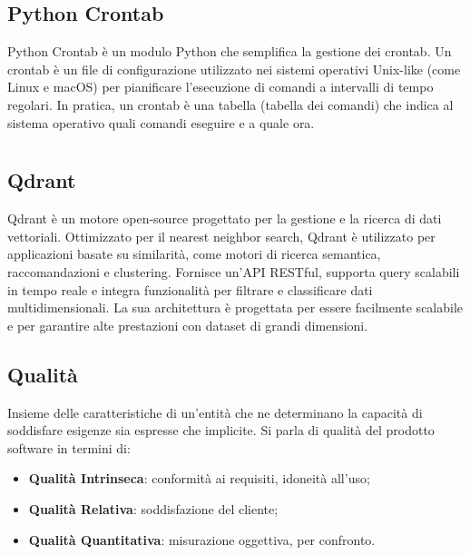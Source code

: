 \hypertarget{sec:python_crontab}{}
\subsection*{Python Crontab}
Python Crontab è un modulo Python che semplifica la gestione dei crontab. Un crontab è un file di configurazione utilizzato nei 
sistemi operativi Unix-like (come Linux e macOS) per pianificare l'esecuzione di comandi a intervalli di tempo regolari. In pratica, 
un crontab è una tabella (tabella dei comandi) che indica al sistema operativo quali comandi eseguire e a quale ora.

\newpage



\section{}

\hypertarget{sec:qdrant}{}
\subsection*{Qdrant}
Qdrant è un motore open-source progettato per la gestione e la ricerca di dati vettoriali. Ottimizzato per il nearest neighbor search, Qdrant è utilizzato 
per applicazioni basate su similarità, come motori di ricerca semantica, raccomandazioni e clustering. Fornisce un'API RESTful, supporta query scalabili in 
tempo reale e integra funzionalità per filtrare e classificare dati multidimensionali. La sua architettura è progettata per essere facilmente scalabile e 
per garantire alte prestazioni con dataset di grandi dimensioni.

\hypertarget{sec:Qualità}{}
\subsection*{Qualità}
Insieme delle caratteristiche di un’entità che ne determinano la capacità di soddisfare esigenze sia espresse che implicite. Si parla di qualità del prodotto software in termini di:
\begin{itemize}
    \item \textbf{Qualità Intrinseca}: conformità ai requisiti, idoneità all’uso;
    \item \textbf{Qualità Relativa}: soddisfazione del cliente;
    \item \textbf{Qualità Quantitativa}: misurazione oggettiva, per confronto.
\end{itemize}

